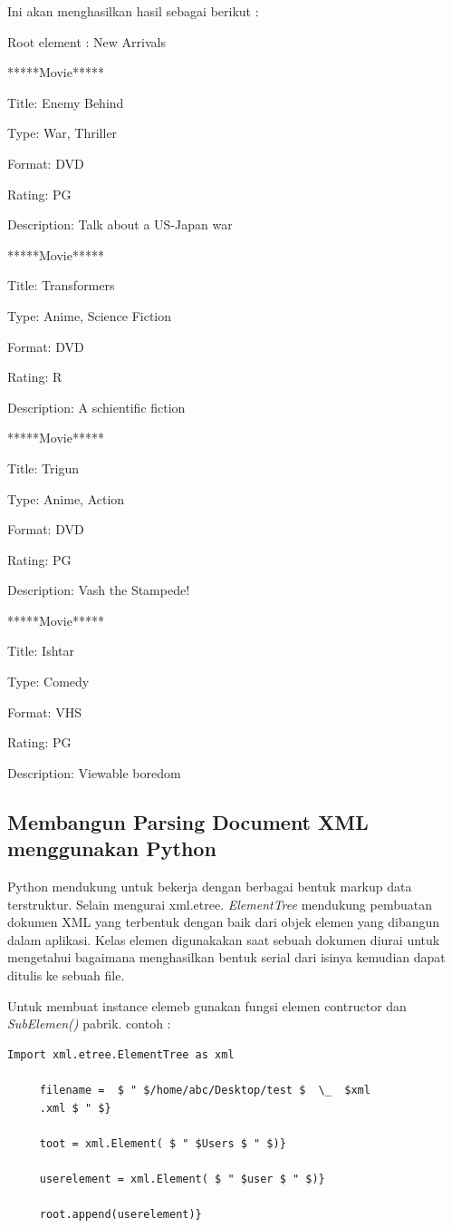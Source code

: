 \vspace{12pt}
Ini akan menghasilkan hasil sebagai berikut : 
 
Root element : New Arrivals 
 
*****Movie***** 
 
Title: Enemy Behind 
 
Type: War, Thriller 
 
Format: DVD 
 
Rating: PG 
 
Description: Talk about a US-Japan war 
 
*****Movie***** 
 
Title: Transformers 
 
Type: Anime, Science Fiction 
 
Format: DVD 
 
Rating: R 
 
Description: A schientific fiction 
 
*****Movie***** 
 
Title: Trigun 
 
Type: Anime, Action 
 
Format: DVD 
 
Rating: PG 
 
Description: Vash the Stampede! 
 
*****Movie***** 
 
Title: Ishtar 
 
Type: Comedy 
 
Format: VHS 
 
Rating: PG 
 
Description: Viewable boredom 
\vspace{10pt}
 
\subsection{ Membangun Parsing Document XML menggunakan Python} 
 
\hspace*{0.5in} Python mendukung untuk bekerja dengan berbagai bentuk markup data terstruktur. Selain mengurai xml.etree. \textit{ElementTree} mendukung pembuatan dokumen XML yang terbentuk dengan baik dari objek elemen yang dibangun dalam aplikasi. Kelas elemen digunakakan saat sebuah dokumen diurai untuk mengetahui bagaimana menghasilkan bentuk serial dari isinya kemudian dapat ditulis ke sebuah file.  
 
\hspace*{0.5in} Untuk membuat instance elemeb gunakan fungsi elemen contructor dan \textit{SubElemen()} pabrik. 
contoh :
\begin{verbatim}
Import xml.etree.ElementTree as xml 

     filename =  $ " $/home/abc/Desktop/test $  \_  $xml
     .xml $ " $} 
 
     toot = xml.Element( $ " $Users $ " $)} 
 
     userelement = xml.Element( $ " $user $ " $)} 
 
     root.append(userelement)} 
\end{verbatim}

